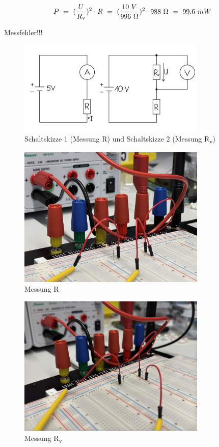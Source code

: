 \documentclass[a4paper,12pt]{article}
\begin{document}
\[
P ~=~  (\frac{U}{R\textsubscript{v}})^2 \cdot R ~=~ (\frac{10~V}{996~\Omega})^2 \cdot 988~\Omega ~=~ 99.6~mW
\]

\noindent Messfehler!!!

\begin{figure}[H]
    \centering
    \includegraphics[width=0.8\textwidth]{../Quellen/Labor2/Schaltskizzen Widerstandsmessung.jpeg}
\caption{Schaltskizze 1 (Messung R) und Schaltskizze 2 (Messung R\textsubscript{v})}
\end{figure}



\begin{figure}[H]
    \centering
    \includegraphics[width=0.8\textwidth]{../Quellen/Labor2/Fotos/IMG_3979.jpeg}
\caption{Messung R}
\end{figure}

\begin{figure}[H]
    \centering
    \includegraphics[width=0.8\textwidth]{../Quellen/Labor2/Fotos/IMG_3980.jpeg}
\caption{Messung R\textsubscript{v}}
\end{figure}
\end{document}
